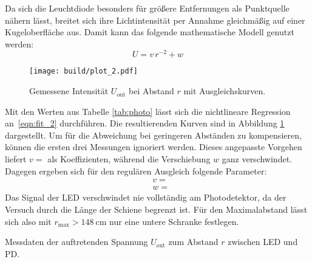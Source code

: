 Da sich die Leuchtdiode besonders für größere Entfernungen als Punktquelle nähern lässt, breitet sich ihre
Lichtintensität per Annahme gleichmäßig auf einer Kugeloberfläche aus. Damit kann das folgende mathematische
Modell genutzt werden:
\begin{equation}
	U = v \, r^{-2} + w
	\label{eqn:fit_2}
\end{equation}
\begin{figure}[H]
	\texttt{[image: build/plot\_2.pdf]}
	\caption{Gemessene Intensität $U_{\! \text{out}}$ bei Abstand $r$ mit Ausgleichskurven.}
	\label{fig:photo-plot}
\end{figure}
Mit den Werten aus Tabelle \ref{tab:photo} lässt sich die nichtlineare Regression an~\eqref{eqn:fit_2}
durchführen. Die resultierenden Kurven sind in Abbildung \ref{fig:photo-plot} dargestellt. Um für die
Abweichung bei geringeren Abständen zu kompensieren, können die ersten drei Messungen ignoriert werden.
Dieses angepasste Vorgehen liefert $v = $ als Koeffizienten, während die
Verschiebung $w$ ganz verschwindet. Dagegen ergeben sich für den regulären Ausgleich folgende Parameter:
\begin{align*}
	&v =  \\
	&w = 
\end{align*}
Das Signal der LED verschwindet nie vollständig am Photodetektor, da der Versuch durch die Länge der Schiene
begrenzt ist. Für den Maximalabstand lässt sich also mit $r_{\text{max}} > \qty{148}{\centi\meter}$ nur
eine untere Schranke festlegen.

\begin{table}[H]
	\centering
	\captionsetup{width=0.61\linewidth}
	\caption{Messdaten der auftretenden Spannung $U_{\! \text{out}}$ zum Abstand $r$ zwischen LED und PD.}
	
	\label{tab:photo}
	\vspace{1.23ex}
\end{table}
